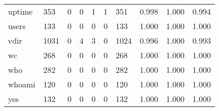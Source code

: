 \begin{longtable}{lp{2.0cm}p{2.0cm}p{2.0cm}p{2.0cm}p{2.0cm}p{2.0cm}p{2.0cm}p{2.0cm}p{2.0cm}}
uptime    &                    353 &                                  0 &                                 0 &                                1 &                                 1 &                             351 &                                   0.998 &                                  1.000 &                                0.994 \\
users     &                    133 &                                  0 &                                 0 &                                0 &                                 0 &                             133 &                                   1.000 &                                  1.000 &                                1.000 \\
vdir      &                   1031 &                                  0 &                                 4 &                                3 &                                 0 &                            1024 &                                   0.996 &                                  1.000 &                                0.993 \\
wc        &                    268 &                                  0 &                                 0 &                                0 &                                 0 &                             268 &                                   1.000 &                                  1.000 &                                1.000 \\
who       &                    282 &                                  0 &                                 0 &                                0 &                                 0 &                             282 &                                   1.000 &                                  1.000 &                                1.000 \\
whoami    &                    120 &                                  0 &                                 0 &                                0 &                                 0 &                             120 &                                   1.000 &                                  1.000 &                                1.000 \\
yes       &                    132 &                                  0 &                                 0 &                                0 &                                 0 &                             132 &                                   1.000 &                                  1.000 &                                1.000 \\
\end{longtable}
